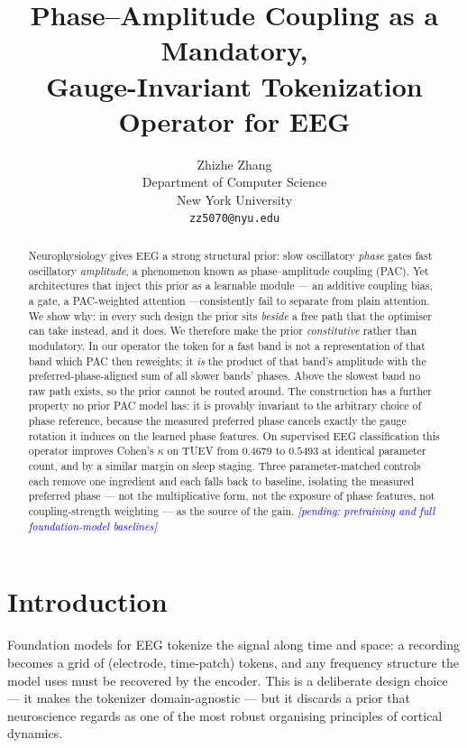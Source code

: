 \documentclass{article}
\title{Phase--Amplitude Coupling as a Mandatory,\\
Gauge-Invariant Tokenization Operator for EEG}
\author{Zhizhe Zhang \\
Department of Computer Science \\
New York University \\
\texttt{zz5070@nyu.edu}}
\newcommand{\pending}[1]{\textcolor{blue}{\textit{[pending: #1]}}}
\begin{document}
\maketitle

\begin{abstract}
Neurophysiology gives EEG a strong structural prior: slow oscillatory
\emph{phase} gates fast oscillatory \emph{amplitude}, a phenomenon known as
phase--amplitude coupling (PAC). Yet architectures that inject this prior as a
learnable module --- an additive coupling bias, a gate, a PAC-weighted attention
---consistently fail to separate from plain attention. We show why: in every such
design the prior sits \emph{beside} a free path that the optimiser can take
instead, and it does. We therefore make the prior \emph{constitutive} rather than
modulatory. In our operator the token for a fast band is not a representation of
that band which PAC then reweights; it \emph{is} the product of that band's
amplitude with the preferred-phase-aligned sum of all slower bands' phases. Above
the slowest band no raw path exists, so the prior cannot be routed around. The
construction has a further property no prior PAC model has: it is provably
invariant to the arbitrary choice of phase reference, because the measured
preferred phase cancels exactly the gauge rotation it induces on the learned
phase features. On supervised EEG classification this operator improves Cohen's
$\kappa$ on TUEV from $0.4679$ to $0.5493$ at identical parameter count, and by a
similar margin on sleep staging. Three parameter-matched controls each remove one
ingredient and each falls back to baseline, isolating the measured preferred
phase --- not the multiplicative form, not the exposure of phase features, not
coupling-strength weighting --- as the source of the gain.
\pending{pretraining and full foundation-model baselines}
\end{abstract}

\section{Introduction}

Foundation models for EEG \citep{yang2023biot,jiang2024labram,wang2025cbramod}
tokenize the signal along time and space: a recording becomes a grid of
(electrode, time-patch) tokens, and any frequency structure the model uses must
be recovered by the encoder. This is a deliberate design choice --- it makes the
tokenizer domain-agnostic --- but it discards a prior that neuroscience regards
as one of the most robust organising principles of cortical dynamics.
\end{document}

